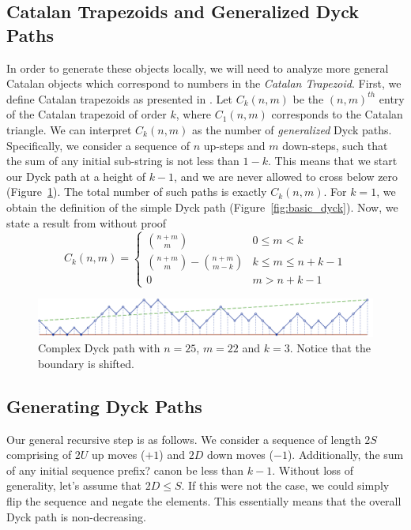 \subsection{Catalan Trapezoids and Generalized Dyck Paths}
In order to generate these objects locally, we will need to analyze more general Catalan objects
which correspond to numbers in the \textit{Catalan Trapezoid}.
First, we define Catalan trapezoids as presented in \cite{trap}.
Let $C_k(n,m)$ be the $(n,m)^{th}$ entry of the Catalan trapezoid of order $k$, where $C_1(n,m)$ corresponds to the Catalan triangle.
We can interpret $C_k(n,m)$ as  the number of \emph{generalized} Dyck paths.
Specifically, we consider a sequence of $n$ up-steps and $m$ down-steps, such that the sum of any initial sub-string is not less than $1-k$.
This means that we start our Dyck path at a height of $k-1$, and we are never allowed to cross below zero (Figure~\ref{fig:complex_dyck}).
The total number of such paths is exactly $C_k(n,m)$.  For $k = 1$, we obtain the definition of the simple Dyck path (Figure~\ref{fig:basic_dyck}).
Now, we state a result from \cite{trap} without proof
$$
C_k(n,m)=
\begin{cases}
{n+m}\choose m &0\le m<k\\
{{n+m}\choose{m}} - {{n+m}\choose{m-k}} &k\le m\le n+k-1\\
0 &m>n+k-1
\end{cases}
$$

\begin{figure}[htbp]
    \centering
    \includegraphics[width=\textwidth]{images/complex_dyck_path.pdf}
    \caption{Complex Dyck path with $n = 25$, $m = 22$ and $k = 3$.
             Notice that the boundary is shifted.} \label{fig:complex_dyck}
\end{figure}

\subsection{Generating Dyck Paths}
Our general recursive step is as follows.
We consider a sequence of length $2S$ comprising of $2U$ up moves ($+1$) and $2D$ down moves ($-1$).
Additionally, the sum of any initial sequence {\color{red} prefix?} canon be less than $k-1$.
Without loss of generality, let's assume that $2D\le S$. If this were not the case,
we could simply flip the sequence and negate the elements.
This essentially means that the overall Dyck path is non-decreasing.

